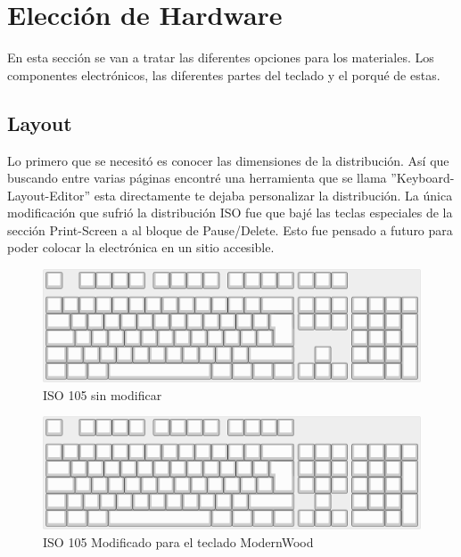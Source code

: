 \section{Elección de Hardware} \label{DiseñoHardware}
En esta sección se van a tratar las diferentes opciones para los materiales. Los componentes electrónicos, las diferentes partes del teclado y el porqué de estas.

\subsection{Layout} \label{DiseñoLayaout}
Lo primero que se necesitó es conocer las dimensiones de la distribución. Así que buscando entre varias páginas encontré una herramienta que se llama ''Keyboard-Layout-Editor'' \cite{Layout-Editor} esta directamente te dejaba personalizar la distribución. La única modificación que sufrió la distribución \gls{ISO} fue que bajé las teclas especiales de la sección Print-Screen a al bloque de Pause/Delete. Esto fue pensado a futuro para poder colocar la electrónica en un sitio accesible.
    
\begin{figure}[H] %
    \centering
    \includegraphics[width=1\textwidth]{imagenes/Capitulos/Cap03/ISO105Layout.png}
    \caption{\gls{ISO} 105 sin modificar}
    \label{fig:ISO_layout}
\end{figure}

\begin{figure}[H] %
    \centering
    \includegraphics[width=1\textwidth]{imagenes/Capitulos/Cap03/ModernWoodLayout.png}
    \caption{\gls{ISO} 105 Modificado para el teclado ModernWood}
    \label{fig:eISo_layout_modificado}
\end{figure}

